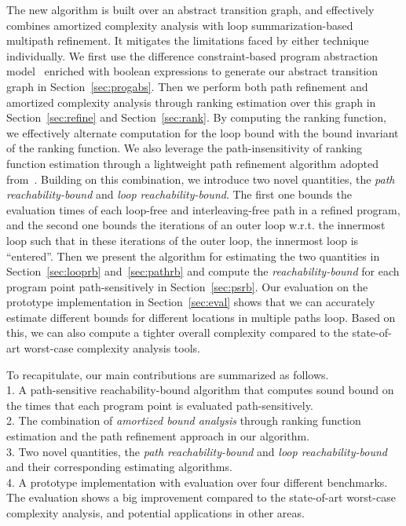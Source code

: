 The new algorithm is built over an abstract transition graph, and effectively combines amortized complexity analysis with loop summarization-based multipath refinement.
It mitigates the limitations faced by either technique individually. 
%
We first use the difference constraint-based program abstraction model~\cite{SinnZV17,SinnZV14} enriched with boolean expressions to generate our abstract transition graph in Section~\ref{sec:progabs}.
Then we perform both path refinement and amortized complexity analysis through ranking estimation over this graph in Section~\ref{sec:refine} and  Section~\ref{sec:rank}.
By computing the ranking function, we effectively alternate computation for the loop bound with the bound invariant of the ranking function. 
We also leverage the path-insensitivity of ranking function estimation through a lightweight path refinement algorithm adopted from~\cite{GulwaniJK09}.
Building on this combination, we introduce two novel quantities,
the \emph{path reachability-bound} and \emph{loop reachability-bound}.
The first one bounds the evaluation times of each loop-free and interleaving-free path in a refined program, and the second one bounds the iterations of an outer loop w.r.t. the innermost loop such that in these iterations of the outer loop, the innermost loop is ``entered''. 
Then we present the algorithm for estimating the two quantities in Section~\ref{sec:looprb} and~\ref{sec:pathrb} and compute the \emph{reachability-bound} for each program point path-sensitively in Section~\ref{sec:psrb}.
Our evaluation on the prototype implementation in Section~\ref{sec:eval} shows that we can accurately estimate different bounds for different locations in multiple paths loop. Based on this, we can also compute a tighter overall complexity compared to the state-of-art worst-case complexity analysis tools.

To recapitulate, our main contributions are summarized as follows.
\\
1. A path-sensitive reachability-bound algorithm that computes sound bound on the times that each program point is evaluated path-sensitively.
\\
2. The combination of \emph{amortized bound analysis} through ranking function estimation and the path refinement approach in our algorithm.
\\
3. Two novel quantities, the \emph{path reachability-bound} and \emph{loop reachability-bound} and their corresponding estimating algorithms.
\\
4. A prototype implementation with evaluation over four different benchmarks.
 The evaluation shows a big improvement compared to the state-of-art worst-case complexity analysis, and potential applications in other areas.

